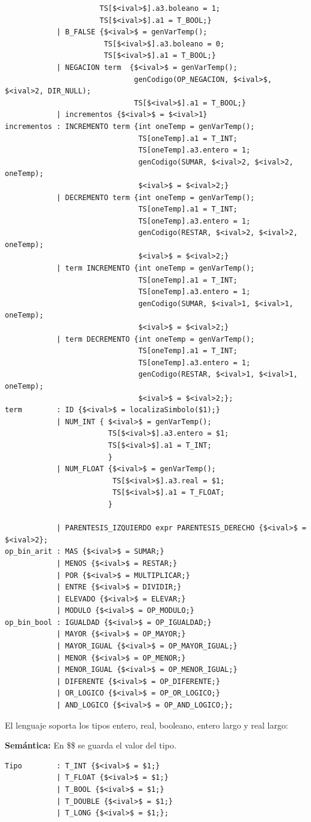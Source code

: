 \documentclass[a4paper,12pt]{article}
\begin{document}
\begin{enumerate}
\begin{enumerate}
\begin{itemize}
\begin{lstlisting}
					  TS[$<ival>$].a3.boleano = 1;
					  TS[$<ival>$].a1 = T_BOOL;}
			| B_FALSE {$<ival>$ = genVarTemp(); 
					   TS[$<ival>$].a3.boleano = 0;
					   TS[$<ival>$].a1 = T_BOOL;}
			| NEGACION term  {$<ival>$ = genVarTemp();
							  genCodigo(OP_NEGACION, $<ival>$, $<ival>2, DIR_NULL);
							  TS[$<ival>$].a1 = T_BOOL;}
			| incrementos {$<ival>$ = $<ival>1}
incrementos	: INCREMENTO term {int oneTemp = genVarTemp();
							   TS[oneTemp].a1 = T_INT;
							   TS[oneTemp].a3.entero = 1;
							   genCodigo(SUMAR, $<ival>2, $<ival>2, oneTemp);
							   $<ival>$ = $<ival>2;}
			| DECREMENTO term {int oneTemp = genVarTemp();
							   TS[oneTemp].a1 = T_INT;
							   TS[oneTemp].a3.entero = 1;
							   genCodigo(RESTAR, $<ival>2, $<ival>2, oneTemp);
							   $<ival>$ = $<ival>2;}
			| term INCREMENTO {int oneTemp = genVarTemp();
							   TS[oneTemp].a1 = T_INT;
							   TS[oneTemp].a3.entero = 1;
							   genCodigo(SUMAR, $<ival>1, $<ival>1, oneTemp);
							   $<ival>$ = $<ival>2;}
			| term DECREMENTO {int oneTemp = genVarTemp();
							   TS[oneTemp].a1 = T_INT;
							   TS[oneTemp].a3.entero = 1;
							   genCodigo(RESTAR, $<ival>1, $<ival>1, oneTemp);
							   $<ival>$ = $<ival>2;};
term 		: ID {$<ival>$ = localizaSimbolo($1);}
			| NUM_INT {	$<ival>$ = genVarTemp(); 
					 	TS[$<ival>$].a3.entero = $1;
					 	TS[$<ival>$].a1 = T_INT;
					 	}
			| NUM_FLOAT {$<ival>$ = genVarTemp(); 
						 TS[$<ival>$].a3.real = $1;
						 TS[$<ival>$].a1 = T_FLOAT;
						}

			| PARENTESIS_IZQUIERDO expr PARENTESIS_DERECHO {$<ival>$ = $<ival>2};
op_bin_arit	: MAS {$<ival>$ = SUMAR;}
			| MENOS {$<ival>$ = RESTAR;}
			| POR {$<ival>$ = MULTIPLICAR;}
			| ENTRE {$<ival>$ = DIVIDIR;}
			| ELEVADO {$<ival>$ = ELEVAR;}
			| MODULO {$<ival>$ = OP_MODULO;}
op_bin_bool : IGUALDAD {$<ival>$ = OP_IGUALDAD;}
			| MAYOR {$<ival>$ = OP_MAYOR;}
			| MAYOR_IGUAL {$<ival>$ = OP_MAYOR_IGUAL;}
			| MENOR {$<ival>$ = OP_MENOR;}
			| MENOR_IGUAL {$<ival>$ = OP_MENOR_IGUAL;}
			| DIFERENTE {$<ival>$ = OP_DIFERENTE;}
			| OR_LOGICO {$<ival>$ = OP_OR_LOGICO;}
			| AND_LOGICO {$<ival>$ = OP_AND_LOGICO;};
   \end{lstlisting} 
   El lenguaje soporta los tipos entero, real, booleano, entero largo y real largo:
   
   \textbf{Semántica:} En \$\$ se guarda el valor del tipo.
   \begin{lstlisting}
Tipo 		: T_INT {$<ival>$ = $1;}
			| T_FLOAT {$<ival>$ = $1;}
			| T_BOOL {$<ival>$ = $1;}
			| T_DOUBLE {$<ival>$ = $1;}
			| T_LONG {$<ival>$ = $1;};
   \end{lstlisting}
   

\end{itemize}
\end{enumerate}
\end{enumerate}
\end{document}
